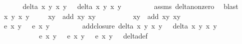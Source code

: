 \begin{isabellebody}
\ \ \ \isamarkupfalse%
\ \isamarkupfalse%
\ {\isachardoublequoteopen}delta\ x{}\ y{}\ x{}\ y{}\ {\isasymnoteq}\ {}{\isachardoublequoteclose}\ {\isachardoublequoteopen}delta\ x{}\ y{}\ x{}\ y{}\ {\isasymnoteq}\ {}{\isachardoublequoteclose}\isanewline
\ \ \ \ \ \isamarkupfalse%
\ assms\ delta{\isacharunderscore}non{\isacharunderscore}zero\ \isamarkupfalse%
\ blast{\isacharplus}\isanewline
\ \ \ \isamarkupfalse%
\ x{}{\isacharprime}\ y{}{\isacharprime}\ x{}{\isacharprime}\ y{}{\isacharprime}\isanewline
\ \ \ \isamarkupfalse%
\ {\isachardoublequoteopen}{\isacharparenleft}x{}{\isacharprime}{\isacharcomma}y{}{\isacharprime}{\isacharparenright}\ {\isacharequal}\ add\ {\isacharparenleft}x{}{\isacharcomma}y{}{\isacharparenright}\ {\isacharparenleft}x{}{\isacharcomma}y{}{\isacharparenright}{\isachardoublequoteclose}\isanewline
\ \ \ \ \ \ \ \ \ \ {\isachardoublequoteopen}{\isacharparenleft}x{}{\isacharprime}{\isacharcomma}y{}{\isacharprime}{\isacharparenright}\ {\isacharequal}\ add\ {\isacharparenleft}x{}{\isacharcomma}y{}{\isacharparenright}\ {\isacharparenleft}x{}{\isacharcomma}y{}{\isacharparenright}{\isachardoublequoteclose}\isanewline
\ \ \ \isamarkupfalse%
\ \isamarkupfalse%
\ {\isachardoublequoteopen}e\ x{}{\isacharprime}\ y{}{\isacharprime}\ {\isacharequal}\ {}{\isachardoublequoteclose}\ {\isachardoublequoteopen}e\ x{}{\isacharprime}\ y{}{\isacharprime}\ {\isacharequal}\ {}{\isachardoublequoteclose}\isanewline
\ \ \ \ \ \isamarkupfalse%
\ add{\isacharunderscore}closure\ {\isacartoucheopen}delta\ x{}\ y{}\ x{}\ y{}\ {\isasymnoteq}\ {}{\isacartoucheclose}\ {\isacartoucheopen}delta\ x{}\ y{}\ x{}\ y{}\ {\isasymnoteq}\ {}{\isacartoucheclose}\ \isanewline
\ \ \ \ \ \ \ \ \ \ \ {\isacartoucheopen}e\ x{}\ y{}\ {\isacharequal}\ {}{\isacartoucheclose}\ {\isacartoucheopen}e\ x{}\ y{}\ {\isacharequal}\ {}{\isacartoucheclose}\ {\isacartoucheopen}e\ x{}\ y{}\ {\isacharequal}\ {}{\isacartoucheclose}\ delta{\isacharunderscore}def\ \isamarkupfalse%

\end{isabellebody}
